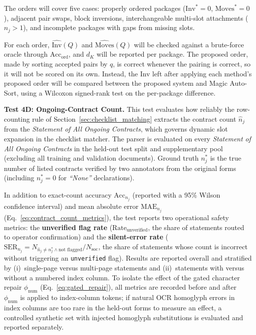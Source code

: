 The orders will cover five cases: properly ordered packages ($\mathrm{Inv}^*=0$, $\mathrm{Moves}^*=0$), adjacent pair swaps, block inversions, interchangeable multi-slot attachments ($n_j>1$), and incomplete packages with gaps from missing slots.

For each order, $\widehat{\mathrm{Inv}}(Q)$ and $\widehat{\mathrm{Moves}}(Q)$ will be checked against a brute-force oracle through $\mathrm{Acc}_{\mathrm{ord}}$, and $d_K$ will be reported per package. The proposed order, made by sorting accepted pairs by $q$, is correct whenever the pairing is correct, so it will not be scored on its own. Instead, the Inv left after applying each method's proposed order will be compared between the proposed system and Magic Auto-Sort, using a Wilcoxon signed-rank test on the per-package difference.

\textbf{Test 4D: Ongoing-Contract Count.} This test evaluates how reliably the row-counting rule of Section~\ref{sec:checklist_matching} extracts the contract count $\hat{n}_j$ from the \emph{Statement of All Ongoing Contracts}, which governs dynamic slot expansion in the checklist matcher. The parser is evaluated on every \emph{Statement of All Ongoing Contracts} in the held-out test split and supplementary pool (excluding all training and validation documents). Ground truth $n_j^*$ is the true number of listed contracts verified by two annotators from the original forms (including $n_j^* = 0$ for \emph{``None''} declarations).

In addition to exact-count accuracy $\mathrm{Acc}_{n_j}$ (reported with a 95\% Wilson confidence interval) and mean absolute error $\mathrm{MAE}_{n_j}$ (Eq.~\eqref{eq:contract_count_metrics}), the test reports two operational safety metrics: the \textbf{unverified flag rate} ($\mathrm{Rate}_{\mathrm{unverified}}$, the share of statements routed to operator confirmation) and the \textbf{silent-error rate} ($\mathrm{SER}_{n_j} = N_{\hat{n}_j \ne n_j^* \wedge \text{not flagged}} / N_{\mathrm{soc}}$, the share of statements whose count is incorrect without triggering an \texttt{unverified} flag). Results are reported overall and stratified by (i)~single-page versus multi-page statements and (ii)~statements with versus without a numbered index column. To isolate the effect of the gated character repair $\phi_{\mathrm{num}}$ (Eq.~\eqref{eq:gated_repair}), all metrics are recorded before and after $\phi_{\mathrm{num}}$ is applied to index-column tokens; if natural OCR homoglyph errors in index columns are too rare in the held-out forms to measure an effect, a controlled synthetic set with injected homoglyph substitutions is evaluated and reported separately.


